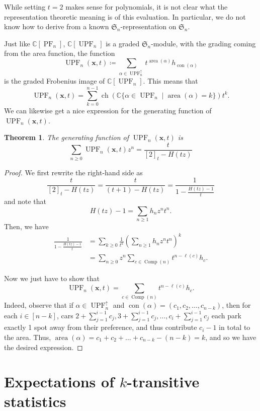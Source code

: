 \documentclass{amsart}
\renewcommand{\S}{\mathfrak{S}}
\newcommand{\CC}{\mathbb{C}}
\DeclareMathOperator{\area}{area}
\DeclareMathOperator{\PF}{PF}
\DeclareMathOperator{\UPF}{UPF} %
\DeclareMathOperator{\Comp}{Comp}
\DeclareMathOperator{\ch}{ch}
\DeclareMathOperator{\con}{con}
\newcommand{\lp}{\left(}
\newcommand{\rp}{\right)}
\newtheorem{theorem}{Theorem}[section]
\theoremstyle{definition}
\begin{document}
While setting $t=2$ makes sense for polynomials, it is not clear what the representation theoretic meaning is of this evaluation. In particular, we do not know how to derive  from a known $\S_n$-representation on $\S_n$. 

Just like $\CC[\PF_n]$, $\CC[\UPF_n]$ is a graded $\S_n$-module, with the grading coming from the area function, the function
\[\UPF_n(\mathbf{x},t)\coloneqq\sum_{\alpha\in \UPF_n^\uparrow}t^{\area(\alpha)}h_{\con(\alpha)}\]
is the graded Frobenius image of $\CC[\UPF_n]$. This means that
\[\UPF_n(\mathbf{x},t)=\sum_{k=0}^{n-1} \ch\lp \CC\{\alpha\in \UPF_n\mid \area(\alpha)=k\}\rp t^k. \]
We can likewise get a nice expression for the generating function of $\UPF_n(\mathbf{x},t)$.

\begin{theorem}
The generating function of $\UPF_n(\mathbf{x},t)$ is
    \[\sum_{n\geq 0}\UPF_n(\mathbf{x},t) z^n=\frac{t}{[2]_t-H(tz)}\]
\end{theorem}
\begin{proof}
We first rewrite the right-hand side as \[\frac{t}{[2]_t-H(tz)}=\frac{t}{(t+1)-H(tz)}=\frac{1}{1-\frac{H(tz)-1}{t}}\]
and note that
\[H(tz)-1=\sum_{n\geq 1}h_nz^nt^n.\]
Then, we have \begin{align*}
    \frac{1}{1-\frac{H(tz)-1}{t}}&=\sum_{k\geq 0}\frac{1}{t^k}\lp \sum_{n\geq 1}h_n z^n t^n\rp ^k\\
    &=\sum_{n\geq 0}z^n \sum_{c\in \Comp(n)}t^{n-\ell(c)}  h_c. \end{align*} 

Now we just have to show that \[\UPF_n(\mathbf{x},t) = \sum_{c\in \Comp(n)}t^{n-\ell(c)}h_c.\]
Indeed, observe that if $\alpha\in \UPF_n^\uparrow$ and $\con(\alpha)=(c_1,c_2,\dots,c_{n-k})$, then for each $i\in [n-k]$, cars $2+\sum_{j=1}^{i-1}c_j, 3+\sum_{j=1}^{i-1}c_j, \dots, c_i+\sum_{j=1}^{i-1}c_j$ each park exactly 1 spot away from their preference, and thus contribute $c_i-1$ in total to the area. Thus, $\area(\alpha)=c_1+c_2+\dots+c_{n-k}-(n-k)=k$, and so we have the desired expression.
\end{proof}


\section{Expectations of \texorpdfstring{$k$}{k}-transitive statistics}\label{sec:expectations}
\end{document}
